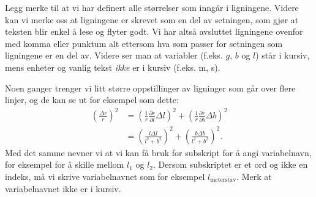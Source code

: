\documentclass[5p]{elsarticle}
\begin{document}


Legg merke til at vi har definert alle størrelser som inngår i ligningene. Videre kan vi merke oss at ligningene er
skrevet som en del av setningen, som gjør at teksten blir enkel å lese og flyter godt. Vi har altså avsluttet ligningene ovenfor med komma eller
punktum alt ettersom hva som passer for setningen som ligningene er en del av. Videre ser man at variabler (f.eks. $g$, $b$ og $l$) står i 
kursiv, mens enheter og vanlig tekst \emph{ikke} er i kursiv (f.eks. m, s).

Noen ganger trenger vi litt større oppstillinger av ligninger som går over flere linjer, og de kan se ut for eksempel som dette:
\begin{align}
	\left( \frac{\Delta r}{r} \right)^2 
	    &= \left( \frac{1}{r} \frac{\partial r}{\partial l} \Delta l \right)^2 
	        + \left( \frac{1}{r} \frac{\partial r}{\partial b} \Delta b \right)^2 \nonumber \\
		&=  \left( \frac{l \Delta l}{l^2 + b^2} \right)^2 + \left(\frac{b \Delta b}{l^2 + b^2} \right)^2.
\end{align}
Med det samme nevner vi at vi kan få bruk for subskript for å angi variabelnavn, for eksempel for å skille mellom $l_1$ og $l_2$.
Dersom subskriptet er et ord og ikke en indeks, må vi skrive variabelnavnet som for eksempel $l_\text{meterstav}$.
Merk at variabelnavnet ikke er i kursiv.

\end{document}
